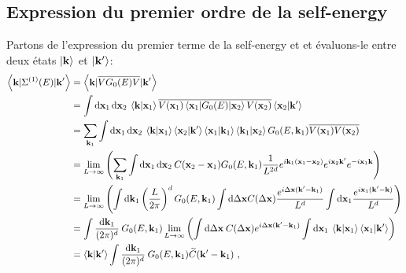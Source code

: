 \subsection{Expression du premier ordre de la self-energy}
Partons de l'expression du premier terme de la self-energy et et évaluons-le entre deux états $\left| \mathbf{k} \right\rangle$ et $\left| \mathbf{k}' \right\rangle$:
\begin{align}
\left\langle \mathbf{k} | \Sigma^{(1)}(E) | \mathbf{k}' \right\rangle &= \left\langle \mathbf{k} | \overline{V G_0(E) V} | \mathbf{k}' \right\rangle \\
&= \int{ \mathop{}\mathopen{}\mathrm{d}\mathbf{x}_{\mathrm{1}} \mathop{}\mathopen{}\mathrm{d}\mathbf{x}_{\mathrm{2}} \: \left\langle \mathbf{k} | \mathbf{x}_{\mathrm{1}} \right\rangle \overline{V(\mathbf{x}_{\mathrm{1}}) \left\langle \mathbf{x}_{\mathrm{1}} | G_0(E) | \mathbf{x}_{\mathrm{2}}\right\rangle V(\mathbf{x}_{\mathrm{2}}) } \left\langle \mathbf{x}_{\mathrm{2}} |\mathbf{k}' \right\rangle} \\
&= \sum_{\mathbf{k}_{\mathrm{1}}}{\int{\mathop{}\mathopen{}\mathrm{d}\mathbf{x}_{\mathrm{1}} \mathop{}\mathopen{}\mathrm{d}\mathbf{x}_{\mathrm{2}} \: \left\langle \mathbf{k} |\mathbf{x}_{\mathrm{1}} \right\rangle \left\langle \mathbf{x}_{\mathrm{2}} | \mathbf{k}' \right\rangle \left\langle \mathbf{x}_{\mathrm{1}} | \mathbf{k}_{\mathrm{1}} \right\rangle \left\langle \mathbf{k}_{\mathrm{1}} | \mathbf{x}_{\mathrm{2}} \right\rangle G_0(E,\mathbf{k}_{\mathrm{1}})\overline{V(\mathbf{x}_{\mathrm{1}})V(\mathbf{x}_{\mathrm{2}})}}} \\
&= \lim\limits_{L\rightarrow\infty} \left( \sum_{\mathbf{k}_{\mathrm{1}}}{\int{\mathop{}\mathopen{}\mathrm{d}\mathbf{x}_{\mathrm{1}}\mathop{}\mathopen{}\mathrm{d}\mathbf{x}_{\mathrm{2}}\: C(\mathbf{x}_{\mathrm{2}}-\mathbf{x}_{\mathrm{1}}) G_0(E,\mathbf{k}_{\mathrm{1}}) \frac{1}{L^{2d}} e^{i \mathbf{k}_{\mathrm{1}}(\mathbf{x}_{\mathrm{1}}-\mathbf{x}_{\mathrm{2}})} e^{i \mathbf{x}_{\mathrm{2}} \mathbf{k}'} e^{-i \mathbf{x}_{\mathrm{1}} \mathbf{k}} }} \right) \\
&= \lim\limits_{L\rightarrow\infty} \left( \int{\mathop{}\mathopen{}\mathrm{d}\mathbf{k}_{\mathrm{1}}  \left(\frac{L}{2\pi}\right)^d G_0(E,\mathbf{k}_{\mathrm{1}}) \int{\mathop{}\mathopen{}\mathrm{d}\Delta\mathbf{x}  C(\Delta\mathbf{x}) \frac{e^{i \Delta\mathbf{x}(\mathbf{k}'-\mathbf{k}_{\mathrm{1}})}}{L^d}} \int{\mathop{}\mathopen{}\mathrm{d}\mathbf{x}_{\mathrm{1}} \frac{e^{i \mathbf{x}_{\mathrm{1}}(\mathbf{k}'-\mathbf{k})}}{L^d}} } \right) \\
&=\int{\frac{\mathop{}\mathopen{}\mathrm{d}\mathbf{k}_{\mathrm{1}}}{(2\pi)^d} \: G_0(E,\mathbf{k}_{\mathrm{1}}) \lim\limits_{L\rightarrow\infty}\left( \int{\mathop{}\mathopen{}\mathrm{d}\Delta\mathbf{x} \: C(\Delta\mathbf{x}) e^{i\Delta\mathbf{x}(\mathbf{k}'-\mathbf{k}_{\mathrm{1}})}} \int{\mathop{}\mathopen{}\mathrm{d}\mathbf{x}_{\mathrm{1}} \: \left\langle \mathbf{k} | \mathbf{x}_{\mathrm{1}}\right\rangle \left\langle \mathbf{x}_{\mathrm{1}} | \mathbf{k}' \right\rangle } \right)} \\
&= \left\langle \mathbf{k} | \mathbf{k}' \right\rangle \int{\frac{\mathop{}\mathopen{}\mathrm{d}\mathbf{k}_{\mathrm{1}}}{(2\pi)^d} \: G_0(E,\mathbf{k}_{\mathrm{1}}) \widetilde{C}(\mathbf{k}'-\mathbf{k}_{\mathrm{1}})} \text{ ,}
\end{align}
